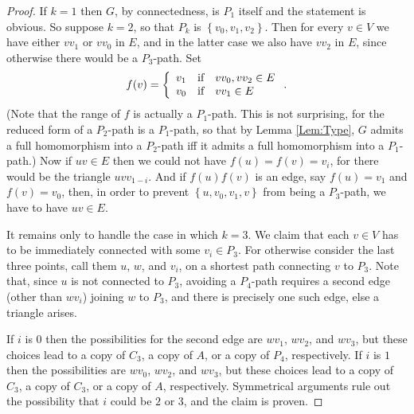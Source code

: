 \documentclass[12pt]{amsart}
\theoremstyle{plain}
\numberwithin{equation}{section}
\begin{document}
\begin{proof}
If $k=1$ then $G$, by connectedness, is $P_{1}$ itself and the statement is
obvious. So suppose $k=2$, so that $P_{k}$ is $\left\{
v_{0},v_{1},v_{2}\right\}  $. Then for every $v\in V$ we have either $vv_{1}$
or $vv_{0}$ in $E$, and in the latter case we also have $vv_{2}$ in $E$, since
otherwise there would be a $P_{3}$-path. Set
\begin{displaymath}
    f(v)=\left\{
    \begin{array}
    [c]{lll}
    v_{1} & \text{if} & vv_{0},vv_{2}\in E\\
    v_{0} & \text{if} & vv_{1}\in E
    \end{array}
    \right.  .
\end{displaymath}
(Note that the range of $f$ is actually a $P_{1}$-path. This is not surprising,
for the reduced form of a $P_{2}$-path is a $P_{1}$-path, so that by Lemma
\ref{Lem:Type}, $G$ admits a full homomorphism into a $P_{2}$-path iff it
admits a full homomorphism into a $P_{1}$-path.) Now if $uv\in E$ then we could
not have $f(u)=f(v)=v_{i}$, for there would be the triangle $uvv_{1-i}$. And if
$f(u)f(v)$ is an edge, say $f(u)=v_{1}$ and $f(v)=v_{0}$, then, in order to
prevent $\left\{  u,v_{0},v_{1},v\right\}  $ from being a $P_{3}$-path, we have
to have $uv\in E$.

It remains only to handle the case in which $k=3$. We claim that each $v\in V$
has to be immediately connected with some $v_{i}\in P_{3}$. For otherwise
consider the last three points, call them $u$, $w$, and $v_{i}$, on a shortest
path connecting $v$ to $P_{3}$. Note that, since $u$ is not connected to
$P_{3}$, avoiding a $P_{4}$-path requires a second edge (other than $wv_{i}$)
joining $w$ to $P_{3}$, and there is precisely one such edge, else a triangle
arises.

If $i$ is $0$ then the possibilities for the second edge are $wv_{1}$,
$wv_{2}$, and $wv_{3}$, but these choices lead to a copy of $C_{3}$, a copy of
$A$, or a copy of $P_{4}$, respectively. If $i$ is $1$ then the possibilities
are $wv_{0}$, $wv_{2}$, and $wv_{3}$, but these choices lead to a copy of
$C_{3}$, a copy of $C_{3}$, or a copy of $A$, respectively. Symmetrical
arguments rule out the possibility that $i$ could be $2$ or $3$, and the claim
is proven.


\end{proof}
\end{document}
